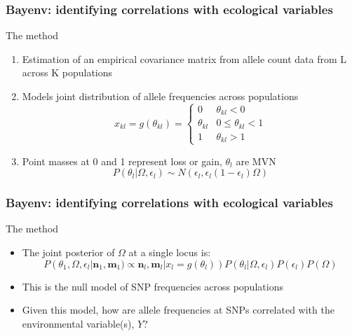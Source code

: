 \begin{frame}
\frametitle{Bayenv: identifying correlations with ecological
variables}
\begin{block}{The method}
\begin{enumerate}
\item{Estimation of an empirical covariance matrix from allele count data from
L across K populations}
\item{Models joint distribution of allele frequencies across populations}
\begin{equation}
x_{kl} = g(\theta_{kl}) = \begin{cases}
	0 & \theta_{kl} < 0 \\
	\theta_{kl} & 0 \le \theta_{kl} < 1 \\
	1 & \theta_{kl} > 1
\end{cases}	
\end{equation}
\item{Point masses at 0 and 1 represent loss or gain, $\theta_l$ are MVN}
\begin{equation}
	P(\theta_l|\Omega, \epsilon_l) \sim
 N(\epsilon_l,\epsilon_l(1-\epsilon_l)\Omega)
\end{equation}
\end{enumerate}
\end{block}
\end{frame}


\begin{frame}
\frametitle{Bayenv: identifying correlations with ecological
variables}
\begin{block}{The method}
\begin{itemize}
\item{The joint posterior of $\Omega$ at a single locus is:}
\begin{equation}
P(\theta_1, \Omega, \epsilon_l | 
\bm{n}_1, \bm{m}_1) \propto \bm{n}_l,\bm{m}_l | x_l = g(\theta_l))
P(\theta_l | \Omega,\epsilon_l)P(\epsilon_l)P(\Omega)	
\end{equation}
\item{This is the null model of SNP frequencies across populations}
\item{Given this model, how are allele frequencies at SNPs correlated with 
the environmental variable(s), $Y$?}
\end{itemize}
\end{block}
\end{frame}


